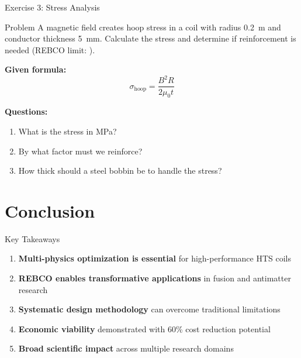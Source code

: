 \begin{frame}{Exercise 3: Stress Analysis}
    \begin{block}{Problem}
        A  magnetic field creates hoop stress in a coil with radius 0.2~m
        and conductor thickness 5~mm. Calculate the stress and determine
        if reinforcement is needed (REBCO limit: ).
    \end{block}
    
    \vspace{0.3cm}
    \textbf{Given formula:}
    \begin{equation}
        \sigma_{\text{hoop}} = \frac{B^2 R}{2 \mu_0 t}
    \end{equation}
    
    \vspace{0.3cm}
    \textbf{Questions:}
    \begin{enumerate}
        \item What is the stress in MPa?
        \item By what factor must we reinforce?
        \item How thick should a steel bobbin be to handle the stress?
    \end{enumerate}
\end{frame}

\section{Conclusion}

\begin{frame}{Key Takeaways}
    \begin{enumerate}
        \item \textbf{Multi-physics optimization is essential} for high-performance HTS coils
        \item \textbf{REBCO enables transformative applications} in fusion and antimatter research
        \item \textbf{Systematic design methodology} can overcome traditional limitations
        \item \textbf{Economic viability} demonstrated with 60\% cost reduction potential
        \item \textbf{Broad scientific impact} across multiple research domains
    \end{enumerate}
    
    \vspace{0.5cm}
    \begin{center}
    \end{center}
\end{frame}


